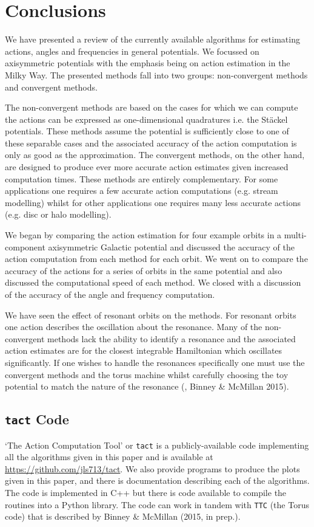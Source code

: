 \documentclass[useAMS,usenatbib,fleqn,a4paper]{mn2e}
\begin{document}
\section{Conclusions}\label{Sect::Conclusions}
We have presented a review of the currently available algorithms for estimating actions, angles and frequencies in general potentials. We focussed on axisymmetric potentials with the emphasis being on action estimation in the Milky Way. The presented methods fall into two groups: non-convergent methods and convergent methods.

The non-convergent methods are based on the cases for which we can compute the actions can be expressed as one-dimensional quadratures i.e. the St\"ackel potentials. These methods assume the potential is sufficiently close to one of these separable cases and the associated accuracy of the action computation is only as good as the approximation. The convergent methods, on the other hand, are designed to produce ever more accurate action estimates given increased computation times. These methods are entirely complementary. For some applications one requires a few accurate action computations (e.g. stream modelling) whilst for other applications one requires many less accurate actions (e.g. disc or halo modelling).

We began by comparing the action estimation for four example orbits in a multi-component axisymmetric Galactic potential and discussed the accuracy of the action computation from each method for each orbit. We went on to compare the accuracy of the actions for a series of orbits in the same potential and also discussed the computational speed of each method. We closed with a discussion of the accuracy of the angle and frequency computation.

We have seen the effect of resonant orbits on the methods. For resonant orbits one action describes the oscillation about the resonance. Many of the non-convergent methods lack the ability to identify a resonance and the associated action estimates are for the closest integrable Hamiltonian which oscillates significantly. If one wishes to handle the resonances specifically one must use the convergent methods and the torus machine whilst carefully choosing the toy potential to match the nature of the resonance (\cite{KaasalainenB}, Binney \& McMillan 2015).

\subsection{\texttt{tact} Code}
`The Action Computation Tool' or \texttt{tact} is a publicly-available code implementing all the algorithms given in this paper and is available at \href{https://github.com/jls713/tact}{https://github.com/jls713/tact}. We also provide programs to produce the plots given in this paper, and there is documentation describing each of the algorithms. The code is implemented in C++ but there is code available to compile the routines into a Python library. The code can work in tandem with \texttt{TTC} (the Torus code) that is described by Binney \& McMillan (2015, in prep.).
\end{document}
